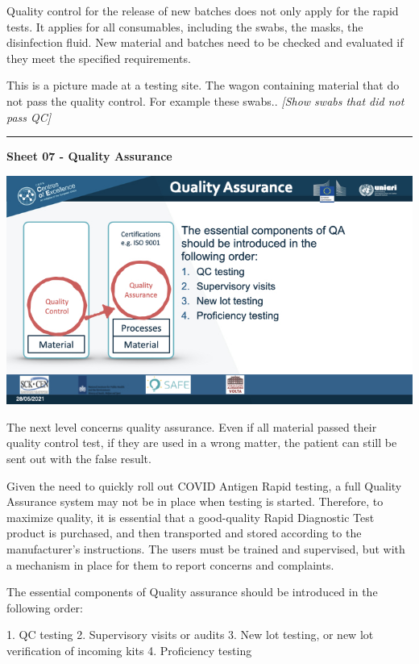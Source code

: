 \documentclass[
]{book}
\begin{document}
Quality control for the release of new batches does not only apply for
the rapid tests. It applies for all consumables, including the swabs,
the masks, the disinfection fluid. New material and batches need to be
checked and evaluated if they meet the specified requirements.

This is a picture made at a testing site. The wagon containing material
that do not pass the quality control. For example these swabs.. \emph{{[}Show
swabs that did not pass QC{]}}

\begin{center}\rule{0.5\linewidth}{0.5pt}\end{center}

\textbf{Sheet 07 - Quality Assurance}

\includegraphics{images/m04/m04_Quality_management_v3.007.jpeg}

The next level concerns quality assurance. Even if all material passed
their quality control test, if they are used in a wrong matter, the
patient can still be sent out with the false result.

Given the need to quickly roll out COVID Antigen Rapid testing, a full
Quality Assurance system may not be in place when testing is started.
Therefore, to maximize quality, it is essential that a good-quality
Rapid Diagnostic Test product is purchased, and then transported and
stored according to the manufacturer's instructions. The
users must be trained and supervised, but with a mechanism in place for
them to report concerns and complaints.

The essential components of Quality assurance should be introduced in
the following order:

1. QC testing
2. Supervisory visits or audits
3. New lot testing, or new lot verification of incoming kits
4. Proficiency testing
\end{document}
